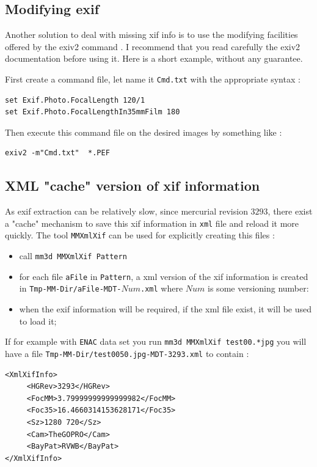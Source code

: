 \subsection{Modifying  exif}

Another solution to deal with missing xif info is to use the
modifying facilities offered by the  exiv2 command .
I recommend that you read carefully
the exiv2 documentation before using it. Here is a short example,
without  any guarantee.

First create a command file, let name it {\tt Cmd.txt} with the appropriate syntax :

\begin{verbatim}
set Exif.Photo.FocalLength 120/1
set Exif.Photo.FocalLengthIn35mmFilm 180
\end{verbatim}

Then execute this command file on the desired images by something like :

\begin{verbatim}
exiv2 -m"Cmd.txt"  *.PEF
\end{verbatim}



\subsection{XML "cache" version of xif information}

As exif extraction can be relatively slow, since mercurial revision $3293$, there exist a
"cache" mechanism to save this xif information in {\tt xml} file and reload it more quickly.
The tool {\tt MMXmlXif} can be used for explicitly creating this files :

\begin{itemize}
   \item call {\tt mm3d MMXmlXif Pattern}
   \item  for each file {\tt aFile} in {\tt Pattern}, a xml version of the xif information is created in
	  {\tt Tmp-MM-Dir/aFile-MDT-$Num$.xml}  where $Num$ is some versioning number:
    \item when the exif information will be required, if the  xml file exist, it will be used to load it;
\end{itemize}

If for example with {\tt ENAC} data set you run {\tt mm3d MMXmlXif test00.*jpg}
you will have a file {\tt Tmp-MM-Dir/test0050.jpg-MDT-3293.xml} to contain :

\begin{verbatim}
<XmlXifInfo>
     <HGRev>3293</HGRev>
     <FocMM>3.79999999999999982</FocMM>
     <Foc35>16.4660314153628171</Foc35>
     <Sz>1280 720</Sz>
     <Cam>TheGOPRO</Cam>
     <BayPat>RVWB</BayPat>
</XmlXifInfo>
\end{verbatim}


